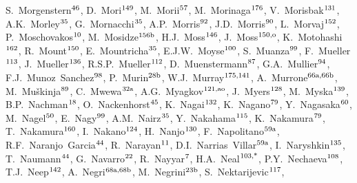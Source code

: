 \begin{flushleft}
S.~Morgenstern$^\textrm{\scriptsize 46}$,    
D.~Mori$^\textrm{\scriptsize 149}$,    
M.~Morii$^\textrm{\scriptsize 57}$,    
M.~Morinaga$^\textrm{\scriptsize 176}$,    
V.~Morisbak$^\textrm{\scriptsize 131}$,    
A.K.~Morley$^\textrm{\scriptsize 35}$,    
G.~Mornacchi$^\textrm{\scriptsize 35}$,    
A.P.~Morris$^\textrm{\scriptsize 92}$,    
J.D.~Morris$^\textrm{\scriptsize 90}$,    
L.~Morvaj$^\textrm{\scriptsize 152}$,    
P.~Moschovakos$^\textrm{\scriptsize 10}$,    
M.~Mosidze$^\textrm{\scriptsize 156b}$,    
H.J.~Moss$^\textrm{\scriptsize 146}$,    
J.~Moss$^\textrm{\scriptsize 150,o}$,    
K.~Motohashi$^\textrm{\scriptsize 162}$,    
R.~Mount$^\textrm{\scriptsize 150}$,    
E.~Mountricha$^\textrm{\scriptsize 35}$,    
E.J.W.~Moyse$^\textrm{\scriptsize 100}$,    
S.~Muanza$^\textrm{\scriptsize 99}$,    
F.~Mueller$^\textrm{\scriptsize 113}$,    
J.~Mueller$^\textrm{\scriptsize 136}$,    
R.S.P.~Mueller$^\textrm{\scriptsize 112}$,    
D.~Muenstermann$^\textrm{\scriptsize 87}$,    
G.A.~Mullier$^\textrm{\scriptsize 94}$,    
F.J.~Munoz~Sanchez$^\textrm{\scriptsize 98}$,    
P.~Murin$^\textrm{\scriptsize 28b}$,    
W.J.~Murray$^\textrm{\scriptsize 175,141}$,    
A.~Murrone$^\textrm{\scriptsize 66a,66b}$,    
M.~Mu\v{s}kinja$^\textrm{\scriptsize 89}$,    
C.~Mwewa$^\textrm{\scriptsize 32a}$,    
A.G.~Myagkov$^\textrm{\scriptsize 121,ao}$,    
J.~Myers$^\textrm{\scriptsize 128}$,    
M.~Myska$^\textrm{\scriptsize 139}$,    
B.P.~Nachman$^\textrm{\scriptsize 18}$,    
O.~Nackenhorst$^\textrm{\scriptsize 45}$,    
K.~Nagai$^\textrm{\scriptsize 132}$,    
K.~Nagano$^\textrm{\scriptsize 79}$,    
Y.~Nagasaka$^\textrm{\scriptsize 60}$,    
M.~Nagel$^\textrm{\scriptsize 50}$,    
E.~Nagy$^\textrm{\scriptsize 99}$,    
A.M.~Nairz$^\textrm{\scriptsize 35}$,    
Y.~Nakahama$^\textrm{\scriptsize 115}$,    
K.~Nakamura$^\textrm{\scriptsize 79}$,    
T.~Nakamura$^\textrm{\scriptsize 160}$,    
I.~Nakano$^\textrm{\scriptsize 124}$,    
H.~Nanjo$^\textrm{\scriptsize 130}$,    
F.~Napolitano$^\textrm{\scriptsize 59a}$,    
R.F.~Naranjo~Garcia$^\textrm{\scriptsize 44}$,    
R.~Narayan$^\textrm{\scriptsize 11}$,    
D.I.~Narrias~Villar$^\textrm{\scriptsize 59a}$,    
I.~Naryshkin$^\textrm{\scriptsize 135}$,    
T.~Naumann$^\textrm{\scriptsize 44}$,    
G.~Navarro$^\textrm{\scriptsize 22}$,    
R.~Nayyar$^\textrm{\scriptsize 7}$,    
H.A.~Neal$^\textrm{\scriptsize 103,*}$,    
P.Y.~Nechaeva$^\textrm{\scriptsize 108}$,    
T.J.~Neep$^\textrm{\scriptsize 142}$,    
A.~Negri$^\textrm{\scriptsize 68a,68b}$,    
M.~Negrini$^\textrm{\scriptsize 23b}$,    
S.~Nektarijevic$^\textrm{\scriptsize 117}$,    

\end{flushleft}
